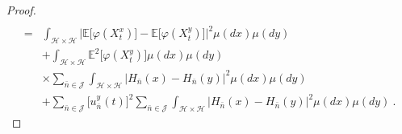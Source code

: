 \documentclass[]{interact}
\newcommand{\E}{\mathbb{E}}
\theoremstyle{plain}%
\theoremstyle{definition}
\theoremstyle{remark}
\begin{document}
\begin{proof}
\begin{equation}
\begin{aligned}
                    \\
                    =&
                    \int_{\mathcal{H}\times \mathcal{H}}
                    \Big|
                        \E\big[
                            \varphi(X_t^x)
                        \big]
                        -
                        \E\big[
                            \varphi(X_t^y)
                        \big]
                    \Big|^2
                    \mu(dx)\mu(dy)
                    \\
                    &+
                    \int_{\mathcal{H}\times \mathcal{H}}
                    \E ^ 2\big[
                        \varphi(X_t^y)
                    \big] \mu(dx) \mu(dy)
                    \\
                    & \times
                    \sum_{\bar n\in \mathcal{J}}
                    \int_{\mathcal{H}\times \mathcal{H}}
                    \Big|
                        H_{\bar n}(x) - H_{\bar n}(y)
                    \Big|^2  \mu(dx)\mu(dy)
                    \\
                    &+
                    \sum_{\bar n\in \mathcal{J}}
                    \big[
                        u_{\bar n}^y(t)
                    \big]^2
                    \sum_{\bar n\in \mathcal{J}}
                    \int_{\mathcal{H}\times \mathcal{H}}
                    \big|
                        H_{\bar n}(x) - H_{\bar n}(y)
                    \big|^2 \mu(dx)\mu(dy)
                    \ .
            \end{aligned}
        \end{equation}
        

\end{proof}
\end{document}
